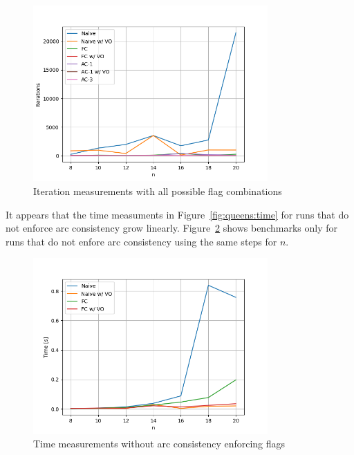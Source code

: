 \begin{figure}[ht]
	\centering
	\includegraphics[width=0.8\textwidth]{./Problems/queens/plots/iterations.png}
	\caption{Iteration measurements with all possible flag combinations}
	\label{fig:queens:iterations}
\end{figure}

It appears that the time measuments in Figure~\ref{fig:queens:time} for runs that do not enforce arc consistency grow linearly. Figure~\ref{fig:queens:time_no_arc} shows benchmarks only for runs that do not enfore arc consistency using the same steps for $n$.

\begin{figure}[ht]
	\centering
	\includegraphics[width=0.8\textwidth]{./Problems/queens/plots/time_no_arc.png}
	\caption{Time measurements without arc consistency enforcing flags}
	\label{fig:queens:time_no_arc}
\end{figure}

